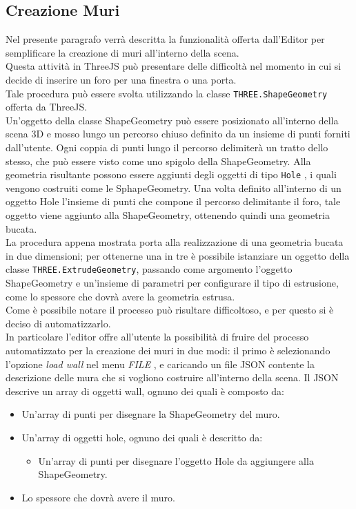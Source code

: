 \subsection{Creazione Muri}
\label{sec:chapter_creazione_scena_funzionalita_editor_muri}
Nel presente paragrafo verrà descritta la funzionalità offerta dall’Editor per semplificare la creazione di muri all’interno della scena.
\\
Questa attività in ThreeJS può presentare delle difficoltà nel momento in cui si decide di inserire un foro per una finestra o una porta.
\\
Tale procedura può essere svolta utilizzando la classe \texttt{THREE.ShapeGeometry} offerta da ThreeJS.
\\
Un’oggetto della classe ShapeGeometry può essere posizionato all'interno della scena 3D e mosso lungo un percorso chiuso definito da un insieme di punti forniti dall’utente. Ogni coppia di punti lungo il percorso delimiterà un tratto dello stesso, che può essere visto come uno spigolo della ShapeGeometry. Alla geometria risultante possono essere aggiunti degli oggetti di tipo \texttt{Hole} , i quali vengono costruiti come le SphapeGeometry. Una volta definito all’interno di un oggetto Hole l’insieme di punti che compone il percorso delimitante il foro, tale oggetto viene aggiunto alla ShapeGeometry, ottenendo quindi una geometria bucata.
\\
La procedura appena mostrata porta alla realizzazione di una geometria bucata in due dimensioni; per ottenerne una in tre è possibile istanziare un oggetto della classe \texttt{THREE.ExtrudeGeometry}, passando come argomento l’oggetto ShapeGeometry e un’insieme di parametri per configurare il tipo di estrusione, come lo spessore che dovrà avere la geometria estrusa. 
\\
Come è possibile notare il processo può risultare difficoltoso, e per questo si è deciso di automatizzarlo.
\\ 
In particolare l’editor offre all’utente la possibilità di fruire del processo automatizzato per la creazione dei muri in due modi: il primo è selezionando l’opzione \emph{load wall} nel menu \emph{FILE} , e caricando un file JSON contente la descrizione delle mura che si vogliono costruire all’interno della scena. 
Il JSON descrive un array di oggetti wall, ognuno dei quali è composto da:
\begin{itemize}
\item Un’array di punti per disegnare la ShapeGeometry del muro.
\item Un’array di oggetti hole, ognuno dei quali è descritto da:
\begin{itemize}
\item Un’array di punti per disegnare l’oggetto Hole da aggiungere alla ShapeGeometry.
\end{itemize}
\item Lo spessore che dovrà avere il muro.
\end{itemize}
